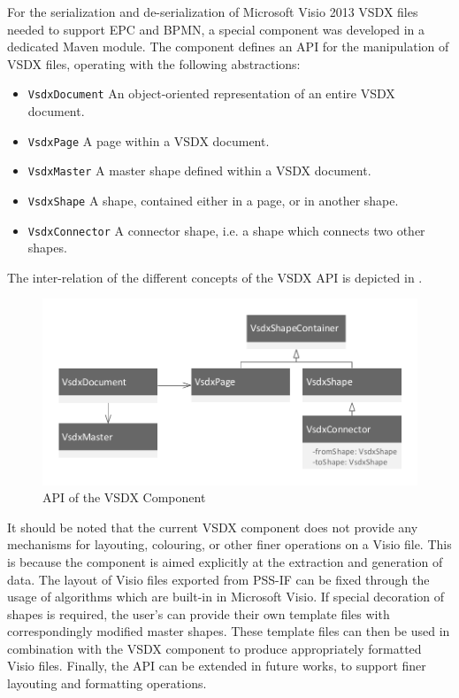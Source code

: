 For the serialization and de-serialization of Microsoft Visio 2013 VSDX files needed to support EPC and BPMN, a special component was developed in a dedicated Maven module. The component defines an API for the manipulation of VSDX files, operating with the following abstractions:

\begin{itemize}
\item \texttt{VsdxDocument} An object-oriented representation of an entire VSDX document.
\item \texttt{VsdxPage} A page within a VSDX document.
\item \texttt{VsdxMaster} A master shape defined within a VSDX document.
\item \texttt{VsdxShape} A shape, contained either in a page, or in another shape.
\item \texttt{VsdxConnector} A connector shape, i.e. a shape which connects two other shapes.
\end{itemize}

The inter-relation of the different concepts of the VSDX API is depicted in .

\begin{figure}[h]
\centering
\includegraphics[scale=0.75]{figures/visio.pdf}
\caption{API of the VSDX Component}
\label{fig:vsdxapi}
\end{figure}

It should be noted that the current VSDX component does not provide any mechanisms for layouting, colouring, or other finer operations on a Visio file. This is because the component is aimed explicitly at the extraction and generation of data. The layout of Visio files exported from PSS-IF can be fixed through the usage of algorithms which are built-in in Microsoft Visio. If special decoration of shapes is required, the user's can provide their own template files with correspondingly modified master shapes. These template files can then be used in combination with the VSDX component to produce appropriately formatted Visio files. Finally, the API can be extended in future works, to support finer layouting and formatting operations.

